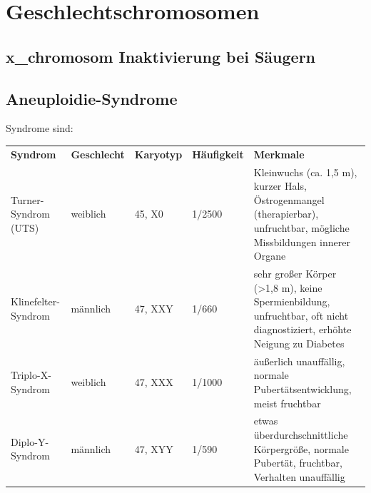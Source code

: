 





\section{Geschlechtschromosomen}\label{sec:geschlechtschromosomen}


\subsection{\gls{x_chromosom} Inaktivierung bei Säugern}\label{subsec:x-chromosom-inaktivierung-bei-saugern}

\subsection{Aneuploidie-Syndrome}\label{subsec:aneuploidie-syndrome}
Syndrome sind:
\begin{mytable}
    \begin{tabular}{ p{2cm} p{2cm} p{2cm} p{2cm} p{7cm} }
        \textbf{Syndrom} & \textbf{Geschlecht} & \textbf{Karyotyp} & \textbf{Häufigkeit} & \textbf{Merkmale} \\
        Turner-Syndrom (UTS)
        & weiblich
        & 45, X0
        & 1/2500
        & Kleinwuchs (ca.
        1,5 m), kurzer Hals, Östrogenmangel (therapierbar), unfruchtbar, mögliche Missbildungen innerer Organe \\

        Klinefelter-Syndrom
        & männlich
        & 47, XXY
        & 1/660
        & sehr großer Körper (>1,8 m), keine Spermienbildung, unfruchtbar, oft nicht diagnostiziert, erhöhte Neigung zu Diabetes \\

        Triplo-X-Syndrom
        & weiblich
        & 47, XXX
        & 1/1000
        & äußerlich unauffällig, normale Pubertätsentwicklung, meist fruchtbar \\

        Diplo-Y-Syndrom
        & männlich
        & 47, XYY
        & 1/590
        & etwas überdurchschnittliche Körpergröße, normale Pubertät, fruchtbar, Verhalten unauffällig
    \end{tabular}
    \caption{Chromosomenaberrationen der Geschlechtschromosomen und ihre Merkmale \cite{vorlesung12}}
\end{mytable}

